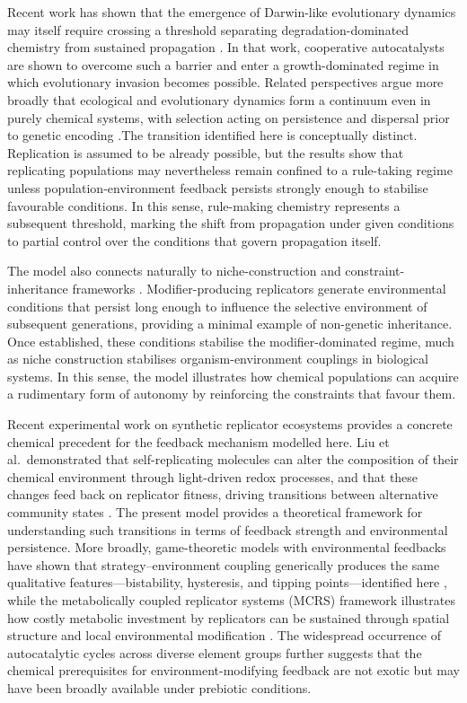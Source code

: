 \documentclass[11pt]{article}
\newcommand{\rev}[1]{#1}
\begin{document}
Recent work has shown that the emergence of Darwin-like evolutionary dynamics may itself require crossing a threshold separating degradation-dominated chemistry from sustained propagation \cite{Kocher2024PrebioticEmergence}. In that work, cooperative autocatalysts are shown to overcome such a barrier and enter a growth-dominated regime in which evolutionary invasion becomes possible. Related perspectives argue more broadly that ecological and evolutionary dynamics form a continuum even in purely chemical systems, with selection acting on persistence and dispersal prior to genetic encoding \cite{Baum2023Continuum}.The transition identified here is conceptually distinct. Replication is assumed to be already possible, but the results show that replicating populations may nevertheless remain confined to a rule-taking regime unless population-environment feedback persists strongly enough to stabilise favourable conditions. In this sense, rule-making chemistry represents a subsequent threshold, marking the shift from propagation under given conditions to partial control over the conditions that govern propagation itself.

The model also connects naturally to niche-construction and constraint-inheritance frameworks \cite{Laland1999Niche}. Modifier-producing replicators generate environmental conditions that persist long enough to influence the selective environment of subsequent generations, providing a minimal example of non-genetic inheritance. Once established, these conditions stabilise the modifier-dominated regime, much as niche construction stabilises organism-environment couplings in biological systems. In this sense, the model illustrates how chemical populations can acquire a rudimentary form of autonomy by reinforcing the constraints that favour them.

\rev{Recent experimental work on synthetic replicator ecosystems provides a concrete chemical precedent for the feedback mechanism modelled here. Liu et al.\ demonstrated that self-replicating molecules can alter the composition of their chemical environment through light-driven redox processes, and that these changes feed back on replicator fitness, driving transitions between alternative community states \citep{Liu2024Otto}. The present model provides a theoretical framework for understanding such transitions in terms of feedback strength and environmental persistence. More broadly, game-theoretic models with environmental feedbacks have shown that strategy--environment coupling generically produces the same qualitative features---bistability, hysteresis, and tipping points---identified here \citep{Tilman2020}, while the metabolically coupled replicator systems (MCRS) framework illustrates how costly metabolic investment by replicators can be sustained through spatial structure and local environmental modification \citep{Czaran2015MCRS,Adamski2020}. The widespread occurrence of autocatalytic cycles across diverse element groups \citep{Peng2023Autocatalysis} further suggests that the chemical prerequisites for environment-modifying feedback are not exotic but may have been broadly available under prebiotic conditions.}
\end{document}
